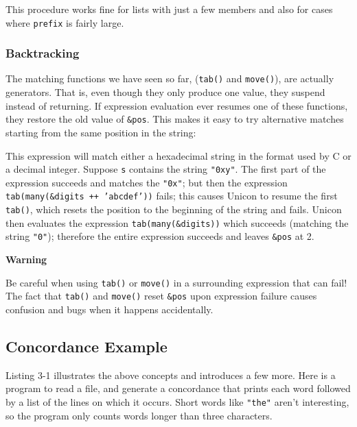 
This procedure works fine for lists with just a few members and also for
cases where \texttt{prefix} is fairly large.

\subsubsection*{Backtracking}

The matching functions we have seen so far,
(\texttt{tab()} and \texttt{move()}), are actually
generators. That is, even though they only produce one
value, they suspend instead of returning. If expression evaluation ever
resumes one of these functions, they restore the old value of
\texttt{\&pos}. This makes it easy to try alternative matches starting
from the same position in the string:


This expression will match either a hexadecimal string in the format
used by C or a decimal integer. Suppose \texttt{s} contains the string
\texttt{"0xy"}. The first part of the
expression succeeds and matches the
\texttt{"0x"}; but then the expression
\texttt{tab(many(\&digits ++
'abcdef'))} fails; this causes Unicon
to resume the first \texttt{tab()}, which resets the position to the
beginning of the string and fails. Unicon then evaluates the expression
\texttt{tab(many(\&digits))} which succeeds (matching the string
\texttt{"0"}); therefore the entire
expression succeeds and leaves \texttt{\&pos} at 2.

{\sffamily\bfseries
Warning}

Be careful when using \texttt{tab()} or \texttt{move()} in a
surrounding expression that can fail! The fact that \texttt{tab()}
and \texttt{move()} reset \texttt{\&pos} upon expression
failure causes confusion and bugs when it happens accidentally.

\subsection*{Concordance Example}

Listing 3-1 illustrates the above concepts and introduces a few more.
Here is a program to read a file, and generate a
concordance that prints each word followed by a list
of the lines on which it occurs. Short words like
\texttt{"the"} aren't
interesting, so the program only counts words longer than three
characters. 

